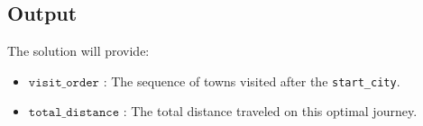 \documentclass{article}
\begin{document}
\subsection*{Output}
The solution will provide:
\begin{itemize}
    \item \( \texttt{visit\_order} \) : The sequence of towns visited after the \texttt{start\_city}.
    \item \( \texttt{total\_distance} \) : The total distance traveled on this optimal journey.
\end{itemize}
\end{document}

